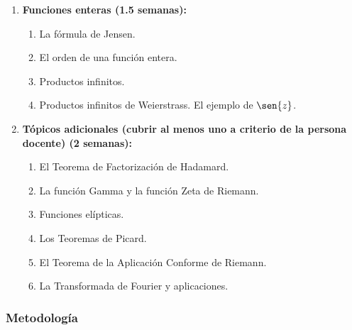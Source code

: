 \begin{refsection}
\begin{enumerate}
\item \textbf{Funciones enteras (1.5 semanas):} 
\begin{enumerate}
    \item La fórmula de Jensen.
    \item El orden de una función entera.
    \item Productos infinitos.
    \item Productos infinitos de Weierstrass. El ejemplo de $\sen{z}$.
\end{enumerate}


\item \textbf{Tópicos adicionales (cubrir al menos uno a criterio de la persona docente) (2 semanas):} 
\begin{enumerate}
    \item El Teorema de Factorización de Hadamard.
    \item La función Gamma y la función Zeta de Riemann.
    \item Funciones elípticas.
    \item Los Teoremas de Picard.
    \item El Teorema de la Aplicación Conforme de Riemann.
    \item La Transformada de Fourier y aplicaciones.
\end{enumerate}

\end{enumerate}

\subsubsection*{Metodología}


\end{refsection}
